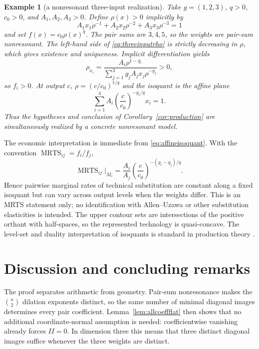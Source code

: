 \documentclass[preprint,12pt]{elsarticle}
\numberwithin{equation}{section}
\newtheorem{example}[theorem]{Example}
\theoremstyle{definition}\newtheorem{definition}[theorem]{Definition}
\theoremstyle{remark}\newtheorem{remark}[theorem]{Remark}
\begin{document}
\begin{example}[a nonresonant three-input realization]\label{ex:production}
Take $g=(1,2,3)$, $q>0$, $c_0>0$, and $A_1,A_2,A_3>0$. Define $\rho(x)>0$ implicitly by
\begin{equation}\label{eq:threeinputrho}
A_1x_1\rho^{-1}+A_2x_2\rho^{-2}+A_3x_3\rho^{-3}=1
\end{equation}
and set $f(x)=c_0\rho(x)^q$. The pair sums are $3,4,5$, so the weights are pair-sum nonresonant. The left-hand side of \eqref{eq:threeinputrho} is strictly decreasing in $\rho$, which gives existence and uniqueness. Implicit differentiation yields
\[
\rho_{x_i}=\frac{A_i\rho^{1-g_i}}{\sum_{j=1}^3g_jA_jx_j\rho^{-g_j}}>0,
\]
so $f_i>0$. At output $c$, $\rho=(c/c_0)^{1/q}$ and the isoquant is the affine plane
\[
\sum_{i=1}^3A_i\left(\frac{c}{c_0}\right)^{-g_i/q}x_i=1.
\]
Thus the hypotheses and conclusion of Corollary~\ref{cor:production} are simultaneously realized by a concrete nonresonant model.
\end{example}

The economic interpretation is immediate from \eqref{eq:affineisoquant}. With the convention $\operatorname{MRTS}_{ij}=f_i/f_j$,
\begin{equation}\label{eq:mrts}
\operatorname{MRTS}_{ij}\big|_{M_c}=\frac{A_i}{A_j}\left(\frac{c}{c_0}\right)^{-(g_i-g_j)/q}.
\end{equation}
Hence pairwise marginal rates of technical substitution are constant along a fixed isoquant but can vary across output levels when the weights differ. This is an MRTS statement only; no identification with Allen--Uzawa or other substitution elasticities is intended. The upper contour sets are intersections of the positive orthant with half-spaces, so the represented technology is quasi-concave. The level-set and duality interpretation of isoquants is standard in production theory \cite{Shephard1970,Lloyd2012}.

\section{Discussion and concluding remarks}\label{sec:discussion}

The proof separates arithmetic from geometry. Pair-sum nonresonance makes the $\binom n2$ dilation exponents distinct, so the same number of minimal diagonal images determines every pair coefficient. Lemma~\ref{lem:allcoeffflat} then shows that no additional coordinate-normal assumption is needed: coefficientwise vanishing already forces $II=0$. In dimension three this means that three distinct diagonal images suffice whenever the three weights are distinct.
\end{document}
